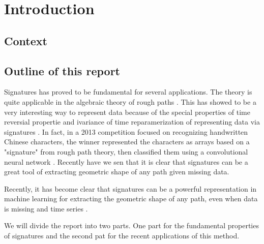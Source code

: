 \section{Introduction}\label{sec:introduction}

\subsection{Context}%
\label{sub:context}




\subsection{Outline of this report}%
\label{sub:outline_of_this_report}

Signatures has proved to be fundamental for several applications.
The theory is quite applicable in the algebraic theory of rough paths \cite{geng2021introduction}. This has showed to be a very interesting way to represent data because of the special properties of time reversial propertie and ivariance of time
reparamerization of representing data via signatures \cite{chevyrev2016primer}. In fact, in a
2013 competition focused on recognizing handwritten
Chinese characters, the winner represented the characters as arrays based on a "signature" from rough path theory, then classified them using a convolutional neural network \cite{yin2013icdar}.
Recently have we sen that it is clear that signatures can be a great tool of extracting geometric shape of any path given missing data.

Recently, it has become clear that signatures can be a powerful representation in machine learning for extracting the geometric shape of any path, even when data is missing \cite{chevyrev2016primer} and time series .



We will divide the report into two parts. One part for the fundamental properties of signatures and the second pat for the recent applications of this method.




